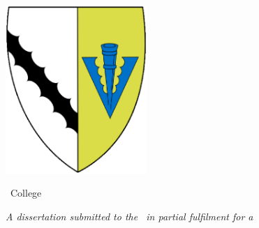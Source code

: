 
\begin{titlingpage}
\begin{flushright}

        \textbf{\theauthor}
\end{flushright}
\begin{center}


        \vspace*{1cm}
            
        \Huge
        \textbf{\thetitle}
            
        \vspace{0.5cm}
        \LARGE
        \tripos
            
        \vspace{1.5cm}
            
            

        \includegraphics[width=0.4\textwidth]{Media/Crests/Sidney_Sussex}            
            
        \Large
        \college\ College\\
        \university
        
        \thedate
        \vfill
        
        \normalsize
        \textit{A dissertation submitted to the \university\ in partial fulfilment for a \degree}
            
    \end{center}
\end{titlingpage}